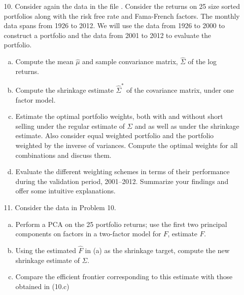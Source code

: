 \begin{enumerate}
\item[10.] Consider again the data in the file . Consider the returns on 25 size sorted portfolios along with the risk free rate and Fama-French factors. The monthly data spans from 1926 to 2012. We will use the data from 1926 to 2000 to construct a portfolio and the data from 2001 to 2012 to evaluate the portfolio. 
	\begin{enumerate}[(a)]
	\item Compute the mean $\hat{\mu}$ and sample convariance matrix, $\hat{\Sigma}$ of the log returns.
	\item Compute the shrinkage estimate $\hat{\Sigma}^*$ of the covariance matrix, under one factor model.
	\item Estimate the optimal portfolio weights, both with and without short selling under the regular estimate of $\Sigma$ and as well as under the shrinkage estimate. Also consider equal weighted portfolio and the portfolio weighted by the inverse of variances. Compute the optimal weights for all combinations and discuss them.
	\item Evaluate the different weighting schemes in terms of their performance during the validation period, 2001--2012. Summarize your findings and offer some intuitive explanations. 
	\end{enumerate}








\item[11.] Consider the data in Problem 10.
	\begin{enumerate}[(a)]
	\item Perform a PCA on the 25 portfolio returns; use the first two principal components on factors in a two-factor model for $F$, estimate $F$.
	\item Using the estimated $\hat{F}$ in (a) as the shrinkage target, compute the new shrinkage estimate of $\Sigma$.
	\item Compare the efficient frontier corresponding to this estimate with those obtained in (10.c)
	\end{enumerate}









\end{enumerate} 